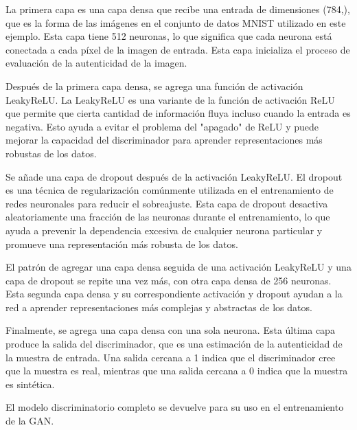 La primera capa es una capa densa que recibe una entrada de dimensiones (784,), que es la forma de las imágenes en el conjunto de datos MNIST utilizado en este ejemplo. Esta capa tiene 512 neuronas, lo que significa que cada neurona está conectada a cada píxel de la imagen de entrada. Esta capa inicializa el proceso de evaluación de la autenticidad de la imagen.

Después de la primera capa densa, se agrega una función de activación LeakyReLU. La LeakyReLU es una variante de la función de activación ReLU que permite que cierta cantidad de información fluya incluso cuando la entrada es negativa. Esto ayuda a evitar el problema del "apagado" de ReLU y puede mejorar la capacidad del discriminador para aprender representaciones más robustas de los datos.

Se añade una capa de dropout después de la activación LeakyReLU. El dropout es una técnica de regularización comúnmente utilizada en el entrenamiento de redes neuronales para reducir el sobreajuste. Esta capa de dropout desactiva aleatoriamente una fracción de las neuronas durante el entrenamiento, lo que ayuda a prevenir la dependencia excesiva de cualquier neurona particular y promueve una representación más robusta de los datos.

El patrón de agregar una capa densa seguida de una activación LeakyReLU y una capa de dropout se repite una vez más, con otra capa densa de 256 neuronas. Esta segunda capa densa y su correspondiente activación y dropout ayudan a la red a aprender representaciones más complejas y abstractas de los datos.

Finalmente, se agrega una capa densa con una sola neurona. Esta última capa produce la salida del discriminador, que es una estimación de la autenticidad de la muestra de entrada. Una salida cercana a 1 indica que el discriminador cree que la muestra es real, mientras que una salida cercana a 0 indica que la muestra es sintética.

El modelo discriminatorio completo se devuelve para su uso en el entrenamiento de la GAN.

